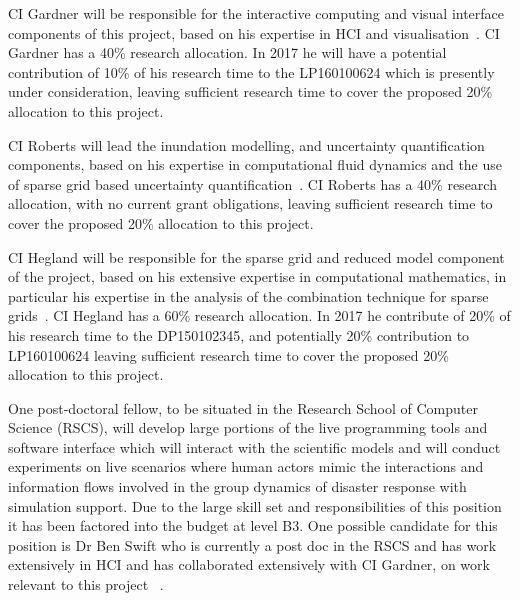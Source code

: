 CI Gardner will be responsible for the interactive computing and visual interface components of this project, based on
his expertise in HCI and visualisation~\parencite{martin2016intelligent,martin2015tracking,swift2014coding,swift2013visual,sorensen2010programming,swiftLive2016}.  CI Gardner has a 40\% research allocation. In 2017 he will have a potential contribution of 10\% of his research time to the LP160100624 which is presently under consideration, leaving sufficient research time to cover the proposed 20\% allocation to this project. 


CI Roberts will lead the inundation modelling, and
uncertainty quantification components, based on his expertise in
computational fluid dynamics and the use of sparse grid based
uncertainty quantification~\parencite{deBaarRDM2015,JakemanRoberts2013,anugamanual,nielsen2005hydrodynamic}.  
CI Roberts has a 40\% research allocation, with no current grant obligations,  leaving sufficient research time to cover the proposed 20\% allocation to this project. 

CI Hegland will be responsible for the
sparse grid and reduced model component of the project, based on his
extensive expertise in computational mathematics, in particular his
expertise in the analysis of the combination technique for sparse
grids~\parencite{AliEtal2015,HardingHLS2015,Ali11022016}. 
CI Hegland has a 60\% research allocation. In 2017 he contribute of 20\% of his research time to the DP150102345, and potentially 20\% contribution to LP160100624 leaving sufficient research time to cover the proposed 20\% allocation to this project. 


One post-doctoral fellow, to be situated in the
Research School of Computer Science (RSCS), will develop large
portions of the live programming tools and software interface which
will interact with the scientific models and will conduct experiments
on live scenarios where human actors mimic the interactions and
information flows involved in the group dynamics of disaster response
with simulation support. Due to the large skill set and responsibilities of 
this position it has been factored into the budget at level B3.
One possible candidate for this position is 
Dr Ben Swift who is currently a post doc in the RSCS and has work 
extensively in HCI and has collaborated extensively with CI Gardner, on work 
relevant to this project ~\parencite{martin2015tracking,martin2016intelligent,swiftLive2016,
swift2013visual,swift2014coding}.

